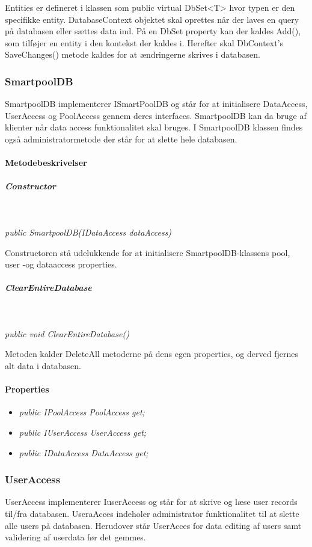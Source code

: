 Entities er defineret i klassen som public virtual DbSet<T> hvor typen er den specifikke entity.
DatabaseContext objektet skal oprettes når der laves en query på databasen eller sættes data ind.
På en DbSet property kan der kaldes Add(), som tilføjer en entity i den kontekst der kaldes i. Herefter skal DbContext’s SaveChanges() metode kaldes for at ændringerne skrives i databasen.

\subsubsection{SmartpoolDB}
SmartpoolDB implementerer ISmartPoolDB og står for at initialisere DataAccess, UserAccess og PoolAccess gennem deres interfaces. SmartpoolDB kan da bruge af klienter når data access funktionalitet skal bruges. I SmartpoolDB klassen findes også administratormetode der står for at slette hele databasen.


\paragraph{Metodebeskrivelser}

\subparagraph{Constructor}\

\textit{public SmartpoolDB(IDataAccess dataAccess)}

Constructoren stå udelukkende for at initialisere SmartpoolDB-klassens pool, user -og dataaccess properties.

\subparagraph{ClearEntireDatabase}\

\textit{public void ClearEntireDatabase()}

Metoden kalder DeleteAll metoderne på dens egen properties, og derved fjernes alt data i databasen.

\paragraph{Properties}

\begin{itemize}
	\item \textit{public IPoolAccess PoolAccess { get; }}
	\item \textit{public IUserAccess UserAccess { get; }}
	\item \textit{public IDataAccess DataAccess { get; }}
\end{itemize}

\subsubsection{UserAccess}
UserAccess implementerer IuserAccess og står for at skrive og læse user records til/fra databasen.
UseraAcces indeholer administrator funktionalitet til at slette alle users på databasen. Herudover står UserAcces for data editing af users samt validering af userdata før det gemmes. 

